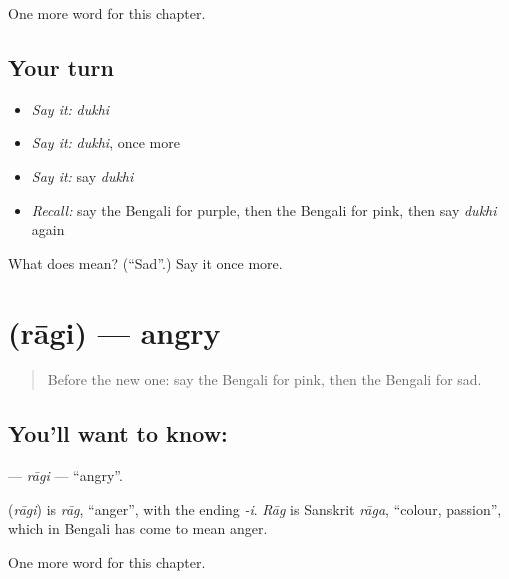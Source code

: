 \begin{grammarlens}[title={What you've built}]
One more word for this chapter.
\end{grammarlens}

\subsection*{Your turn}
\begin{itemize}
\raggedright
  \item \emph{Say it:} \emph{dukhi}
  \item \emph{Say it:} \emph{dukhi}, once more
  \item \emph{Say it:} say \emph{dukhi}
  \item \emph{Recall:} say the Bengali for purple, then the Bengali for pink, then say \emph{dukhi} again
\end{itemize}

\begin{tcolorbox}[breakable,colback=teal!4,colframe=teal!35!black,title={Before you move on}]
What does  mean? (\textquotedblleft{}Sad\textquotedblright{}.) Say it once more.
\end{tcolorbox}
\section[\texorpdfstring{\bn{রাগী} (rāgi)}{রাগী (rāgi)}]{ (rāgi) — angry}

\label{lesson:BN-C137-ragi}



\begin{quote}
Before the new one: say the Bengali for pink, then the Bengali for sad.
\end{quote}

\subsection*{You'll want to know: }
\textbf{} — \emph{rāgi} — \textquotedblleft{}angry\textquotedblright{}.

\begin{cousinweb}
\textbf{} (\emph{rāgi}) is \emph{rāg}, \textquotedblleft{}anger\textquotedblright{}, with the ending \emph{-i}. \emph{Rāg} is Sanskrit \emph{rāga}, \textquotedblleft{}colour, passion\textquotedblright{}, which in Bengali has come to mean anger.
\end{cousinweb}

\begin{grammarlens}[title={What you've built}]
One more word for this chapter.
\end{grammarlens}

